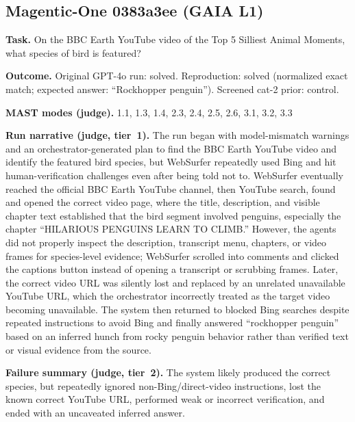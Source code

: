 \subsection*{Magentic-One 0383a3ee (GAIA L1)}
\textbf{Task.} On the BBC Earth YouTube video of the Top 5 Silliest Animal Moments, what species of bird is featured?

\textbf{Outcome.} Original GPT-4o run: solved. Reproduction: solved (normalized exact match; expected answer: ``Rockhopper penguin''). Screened cat-2 prior: control.

\textbf{MAST modes (judge).} 1.1, 1.3, 1.4, 2.3, 2.4, 2.5, 2.6, 3.1, 3.2, 3.3

\textbf{Run narrative (judge, tier~1).} The run began with model-mismatch warnings and an orchestrator-generated plan to find the BBC Earth YouTube video and identify the featured bird species, but WebSurfer repeatedly used Bing and hit human-verification challenges even after being told not to. WebSurfer eventually reached the official BBC Earth YouTube channel, then YouTube search, found and opened the correct video page, where the title, description, and visible chapter text established that the bird segment involved penguins, especially the chapter ``HILARIOUS PENGUINS LEARN TO CLIMB.'' However, the agents did not properly inspect the description, transcript menu, chapters, or video frames for species-level evidence; WebSurfer scrolled into comments and clicked the captions button instead of opening a transcript or scrubbing frames. Later, the correct video URL was silently lost and replaced by an unrelated unavailable YouTube URL, which the orchestrator incorrectly treated as the target video becoming unavailable. The system then returned to blocked Bing searches despite repeated instructions to avoid Bing and finally answered ``rockhopper penguin'' based on an inferred hunch from rocky penguin behavior rather than verified text or visual evidence from the source.

\textbf{Failure summary (judge, tier~2).} The system likely produced the correct species, but repeatedly ignored non-Bing/direct-video instructions, lost the known correct YouTube URL, performed weak or incorrect verification, and ended with an uncaveated inferred answer.

